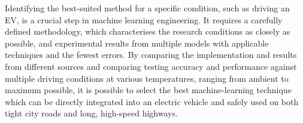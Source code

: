 %
Identifying the best-suited method for a specific condition, such as driving an EV, is a crucial step in machine learning engineering.
It requires a carefully defined methodology, which characterises the research conditions as closely as possible, and experimental results from multiple models with applicable techniques and the fewest errors.
By comparing the implementation and results from different sources and comparing testing accuracy and performance against multiple driving conditions at various temperatures, ranging from ambient to maximum possible, it is possible to select the best machine-learning technique which can be directly integrated  into an electric vehicle and safely used on both tight city roads and long, high-speed highways.
%
